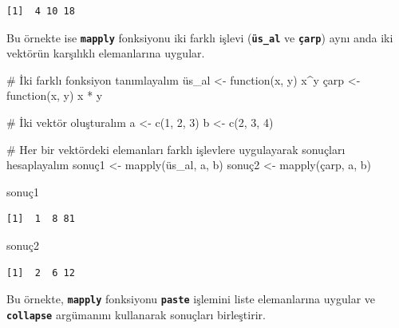 \documentclass[
  letterpaper,
  DIV=11,
  numbers=noendperiod]{scrreprt}
\newenvironment{Shaded}{\begin{snugshade}}{\end{snugshade}}
\newcommand{\CommentTok}[1]{\textcolor[rgb]{0.37,0.37,0.37}{#1}}
\newcommand{\ControlFlowTok}[1]{\textcolor[rgb]{0.00,0.23,0.31}{#1}}
\newcommand{\DecValTok}[1]{\textcolor[rgb]{0.68,0.00,0.00}{#1}}
\newcommand{\FunctionTok}[1]{\textcolor[rgb]{0.28,0.35,0.67}{#1}}
\newcommand{\NormalTok}[1]{\textcolor[rgb]{0.00,0.23,0.31}{#1}}
\newcommand{\OtherTok}[1]{\textcolor[rgb]{0.00,0.23,0.31}{#1}}
\newcommand{\SpecialCharTok}[1]{\textcolor[rgb]{0.37,0.37,0.37}{#1}}
\begin{document}
\begin{verbatim}
[1]  4 10 18
\end{verbatim}

Bu örnekte ise \textbf{\texttt{mapply}} fonksiyonu iki farklı işlevi
(\textbf{\texttt{üs\_al}} ve \textbf{\texttt{çarp}}) aynı anda iki
vektörün karşılıklı elemanlarına uygular.

\begin{Shaded}
\begin{Highlighting}[]
\CommentTok{\# İki farklı fonksiyon tanımlayalım}
\NormalTok{üs\_al }\OtherTok{\textless{}{-}} \ControlFlowTok{function}\NormalTok{(x, y) x}\SpecialCharTok{\^{}}\NormalTok{y}
\NormalTok{çarp }\OtherTok{\textless{}{-}} \ControlFlowTok{function}\NormalTok{(x, y) x }\SpecialCharTok{*}\NormalTok{ y}

\CommentTok{\# İki vektör oluşturalım}
\NormalTok{a }\OtherTok{\textless{}{-}} \FunctionTok{c}\NormalTok{(}\DecValTok{1}\NormalTok{, }\DecValTok{2}\NormalTok{, }\DecValTok{3}\NormalTok{)}
\NormalTok{b }\OtherTok{\textless{}{-}} \FunctionTok{c}\NormalTok{(}\DecValTok{2}\NormalTok{, }\DecValTok{3}\NormalTok{, }\DecValTok{4}\NormalTok{)}

\CommentTok{\# Her bir vektördeki elemanları farklı işlevlere uygulayarak sonuçları hesaplayalım}
\NormalTok{sonuç1 }\OtherTok{\textless{}{-}} \FunctionTok{mapply}\NormalTok{(üs\_al, a, b)}
\NormalTok{sonuç2 }\OtherTok{\textless{}{-}} \FunctionTok{mapply}\NormalTok{(çarp, a, b)}

\NormalTok{sonuç1}
\end{Highlighting}
\end{Shaded}

\begin{verbatim}
[1]  1  8 81
\end{verbatim}

\begin{Shaded}
\begin{Highlighting}[]
\NormalTok{sonuç2}
\end{Highlighting}
\end{Shaded}

\begin{verbatim}
[1]  2  6 12
\end{verbatim}

Bu örnekte, \textbf{\texttt{mapply}} fonksiyonu \textbf{\texttt{paste}}
işlemini liste elemanlarına uygular ve \textbf{\texttt{collapse}}
argümanını kullanarak sonuçları birleştirir.
\end{document}
